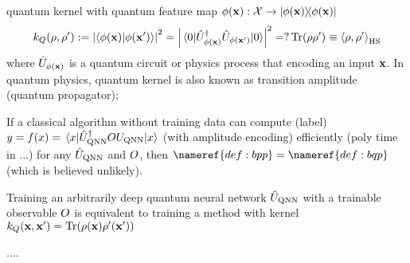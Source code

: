 \begin{definition}\label{def:quantum_kernel}
	quantum kernel 
	with quantum feature map $\phi(\vb{x}): \mathcal{X}\to \op{\phi(\vb{x})}$
	\begin{equation}
		k_Q(\rho,\rho') := \abs{\ip{\phi(\vbx)}{\phi(\vbx')}}^2 =\abs{\mel{0}{\U_{\phi(\vbx)}^\dagger \U_{\phi(\vbx')} }{0}}^2 =? \Tr(\rho\rho') \equiv \expval{\dm,\dm'}_{\textup{HS}}
	\end{equation}
	where $\hat{U}_{\phi(\vb{x})}$ is a quantum circuit or physics process that encoding an input $\vb{x}$.
	In quantum physics, quantum kernel is also known as transition amplitude (quantum propagator);
\end{definition}

\begin{proposition}
	If a classical algorithm without training data can compute (label) $y=f(x)=\mel{x}{\hat{U}_{\textup{QNN}}^\dagger OU_{\textup{QNN}}}{x}$ (with amplitude encoding) efficiently (poly time in ...) for any $\hat{U}_{\textup{QNN}}$ and $O$, then $\nameref{def:bpp}=\nameref{def:bqp}$ (which is believed unlikely).
\end{proposition}
\begin{proposition}
	Training an arbitrarily deep quantum neural network $\hat{U}_{\textup{QNN}}$ with a trainable observable $O$ is equivalent to training a  method with kernel $k_{Q}(\vb{x},\vb{x}')=\Tr(\rho(\vb{x})\rho'(\vb{x}'))$
\end{proposition}
\begin{definition}\label{def:projected_quantum_kernel}
	....
\end{definition}

